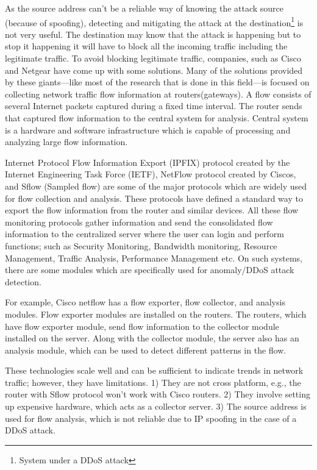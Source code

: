 \documentclass[12pt,oneside,a4paper]{article}
\begin{document}
As the source address can't be a reliable way of knowing the attack source (because of spoofing), detecting and mitigating the attack at the destination\footnote{System under a DDoS attack} is not very useful. The destination may know that the attack is happening but to stop it happening it will have to block all the incoming traffic including the legitimate traffic. To avoid blocking legitimate traffic, companies, such as Cisco and Netgear have come up with some solutions. Many of the solutions provided by these giants---like most of the research that is done in this field---is focused on collecting network traffic flow information\cite{network-traffic-flow} at routers(gateways). A flow consists of several Internet packets captured during a fixed time interval. The router sends that captured flow information to the central system for analysis. Central system is a hardware and software infrastructure which is capable of processing and analyzing large flow information.\par

Internet Protocol Flow Information Export (IPFIX) protocol created by the Internet Engineering Task Force (IETF), NetFlow protocol created by Ciscos\cite{cisco-netflow}, and Sflow (Sampled flow)\cite{sflow} are some of the major protocols which are widely used for flow collection and analysis. These protocols have defined a standard way to export the flow information from the router and similar devices. All these flow monitoring protocols gather information and send the consolidated flow information to the centralized server where the user can login and perform functions; such as Security Monitoring, Bandwidth monitoring, Resource Management, Traffic Analysis, Performance Management etc. On such systems, there are some modules which are specifically used for anomaly/DDoS attack detection.\par

For example, Cisco netflow has a flow exporter, flow collector, and analysis modules. Flow exporter modules are installed on the routers. The routers, which have flow exporter module, send flow information to the collector module installed on the server. Along with the collector module, the server also has an analysis module, which can be used to detect different patterns in the flow.\par

These technologies scale well and can be sufficient to indicate trends in network traffic; however, they have limitations. 1) They are not cross platform, e.g., the router with Sflow protocol won't work with Cisco routers. 2) They involve setting up expensive hardware, which acts as a collector server. 3) The source address is used for flow analysis, which is not reliable due to IP spoofing in the case of a DDoS attack.\par
\end{document}
